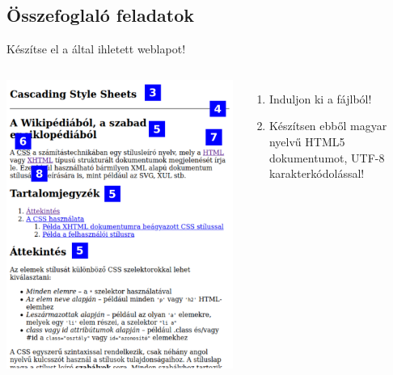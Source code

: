 \subsection{Összefoglaló feladatok}



\begin{frame}
  Készítse el a  által ihletett weblapot!
  \begin{columns}[c]
      \begin{exampleblock}{}
        \includegraphics[width=\textwidth]{css1.pdf}
      \end{exampleblock}
      \begin{enumerate}
        \scriptsize
        \item Induljon ki a  fájlból!
        \item Készítsen ebből magyar nyelvű HTML5 dokumentumot, UTF-8 karakterkódolással!

\end{enumerate}
\end{columns}
\end{frame}
